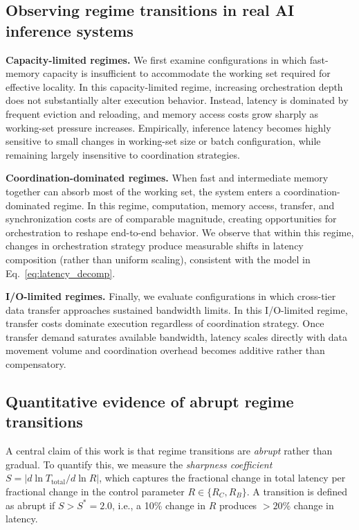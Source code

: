 \subsection{Observing regime transitions in real AI inference systems}
\textbf{Capacity-limited regimes.}
We first examine configurations in which fast-memory capacity is insufficient to accommodate the working set required for effective locality. In this capacity-limited regime, increasing orchestration depth does not substantially alter execution behavior. Instead, latency is dominated by frequent eviction and reloading, and memory access costs grow sharply as working-set pressure increases. Empirically, inference latency becomes highly sensitive to small changes in working-set size or batch configuration, while remaining largely insensitive to coordination strategies.

\textbf{Coordination-dominated regimes.}
When fast and intermediate memory together can absorb most of the working set, the system enters a coordination-dominated regime. In this regime, computation, memory access, transfer, and synchronization costs are of comparable magnitude, creating opportunities for orchestration to reshape end-to-end behavior. We observe that within this regime, changes in orchestration strategy produce measurable shifts in latency composition (rather than uniform scaling), consistent with the model in Eq.~\ref{eq:latency_decomp}.

\textbf{I/O-limited regimes.}
Finally, we evaluate configurations in which cross-tier data transfer approaches sustained bandwidth limits. In this I/O-limited regime, transfer costs dominate execution regardless of coordination strategy. Once transfer demand saturates available bandwidth, latency scales directly with data movement volume and coordination overhead becomes additive rather than compensatory.

\subsection{Quantitative evidence of abrupt regime transitions}

A central claim of this work is that regime transitions are \emph{abrupt}
rather than gradual.
To quantify this, we measure the \emph{sharpness coefficient}
$S = |d\ln T_{\mathrm{total}} / d\ln R|$, which captures the fractional
change in total latency per fractional change in the control parameter
$R \in \{R_C, R_B\}$.
A transition is defined as abrupt if $S > S^* = 2.0$, i.e., a 10\% change
in $R$ produces $> 20\%$ change in latency.

